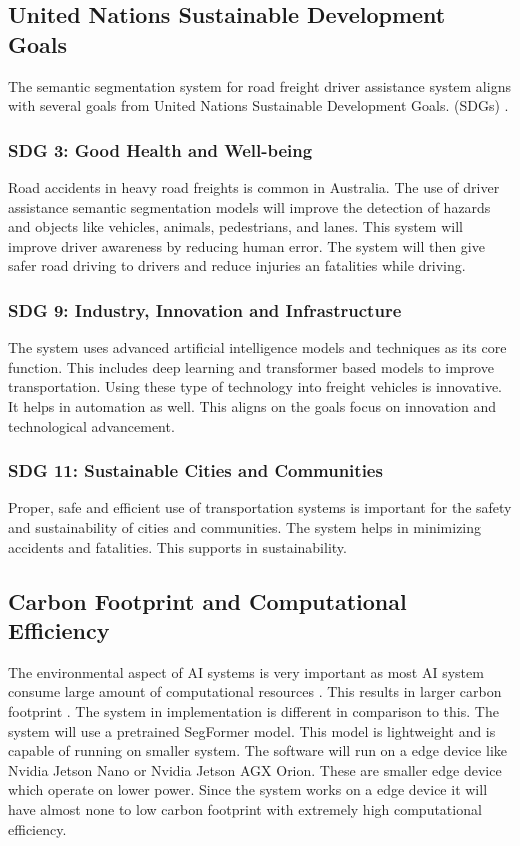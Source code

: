 \documentclass[10pt,journal,compsoc]{IEEEtran}
\begin{document}
\subsection{United Nations Sustainable Development Goals}
The semantic segmentation system for road freight driver assistance system aligns with several goals from United Nations Sustainable Development Goals. (SDGs) \cite{UN_SDGs_2023}. 
\subsubsection{SDG 3: Good Health and Well-being}
Road accidents in heavy road freights is common in Australia. The use of driver assistance semantic segmentation models will improve the detection of hazards and objects like vehicles, animals, pedestrians, and lanes. This system will improve driver awareness by reducing human error. The system will then give safer road driving to drivers and reduce injuries an fatalities while driving.

\subsubsection{SDG 9: Industry, Innovation and Infrastructure}
The system uses advanced artificial intelligence models and techniques as its core function. This includes deep learning and transformer based models to improve transportation. Using these type of technology into freight vehicles is innovative. It helps in automation as well. This aligns on the goals focus on innovation and technological advancement.

\subsubsection{SDG 11: Sustainable Cities and Communities}
Proper, safe and efficient use of transportation systems is important for the safety and sustainability of cities and communities. The system helps in minimizing accidents and fatalities. This supports in sustainability.

\subsection{Carbon Footprint and Computational Efficiency}
The environmental aspect of AI systems is very important as  most AI system consume large amount of computational resources \cite{Arya2024}. This results in larger carbon footprint \cite{Arya2024}. The system in implementation is different in comparison to this. The system will use a pretrained SegFormer model. This model is lightweight and is capable of running on smaller system. The software will run on a edge device like Nvidia Jetson Nano or Nvidia Jetson AGX Orion. These are smaller edge device which operate on lower power. Since the system works on a edge device it will have almost none to low carbon footprint with extremely high computational efficiency.
\end{document}
